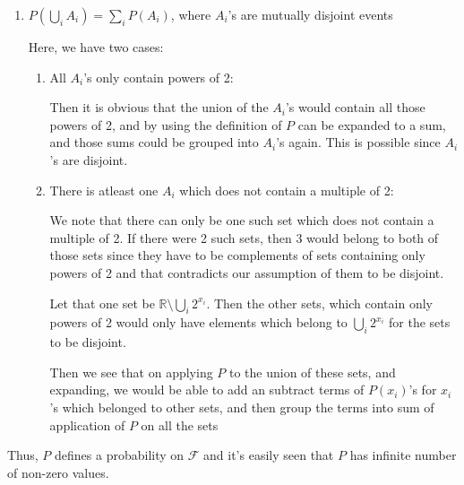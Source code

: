 \documentclass[12pt, oneside]{article}
\begin{document}
\begin{enumerate}
{\begin{enumerate}
{            So, \(P(A^c) = 1 - P(A) \geq 0\) and \(P(\varnothing) = 0 \geq 0\)

            So we have shown that for all type of sets \(A \in \mathcal{F}\), \(P(A) \geq 0\)
        }
        \item {
            \(P(\bigcup_{i} A_i) = \sum_i P(A_i)\), where \(A_i\)'s are mutually disjoint events

            Here, we have two cases:
            \begin{enumerate}
                \item {
                    All \(A_i\)'s only contain powers of 2:

                    Then it is obvious that the union of the \(A_i\)'s would contain
                    all those powers of 2, and by using the definition of \(P\) can
                    be expanded to a sum, and those sums could be grouped into \(A_i\)'s
                    again. This is possible since \(A_i\)'s are disjoint.
                }
                \item {
                    There is atleast one \(A_i\) which does not contain a multiple of 2:

                    We note that there can only be one such set which does not contain a
                    multiple of 2. If there were 2 such sets, then 3 would belong to both
                    of those sets since they have to be complements of sets containing only
                    powers of 2 and that contradicts our assumption of them to be
                    disjoint.

                    Let that one set be \(\mathbb{R} \setminus \bigcup_i 2^{x_i}\). Then
                    the other sets, which contain only powers of 2 would only have elements
                    which belong to \(\bigcup_i 2^{x_i}\) for the sets to be disjoint.

                    Then we see that on applying \(P\) to the union of these sets, and expanding,
                    we would be able to add an subtract terms of \(P(x_i)\)'s for \(x_i\)'s which
                    belonged to other sets, and then group the terms into sum of application of \(P\)
                    on all the sets
                }
            \end{enumerate}
        }
    \end{enumerate}

    Thus, \(P\) defines a probability on \(\mathcal{F}\) and it's easily seen that \(P\)
    has infinite number of non-zero values.
}



\end{enumerate}
\end{document}
